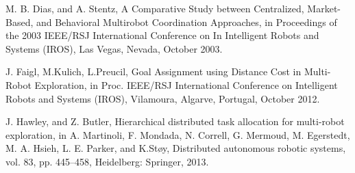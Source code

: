 \documentclass[letterpaper, 10 pt, conference]{ieeeconf}  %
\begin{document}
\begin{thebibliography}{99}
 M. B. Dias, and A. Stentz, A Comparative Study between Centralized, Market-Based, and Behavioral Multirobot Coordination Approaches, in Proceedings of the 2003 IEEE/RSJ  International Conference on In Intelligent Robots and Systems (IROS), Las Vegas, Nevada, October 2003.

 J. Faigl, M.Kulich, L.Preucil, Goal Assignment using Distance Cost in Multi-Robot Exploration, in Proc. IEEE/RSJ  International Conference on Intelligent Robots and Systems (IROS), Vilamoura, Algarve, Portugal, October 2012.

 J. Hawley, and Z. Butler, Hierarchical distributed task allocation for multi-robot exploration, in A. Martinoli, F. Mondada, N. Correll, G. Mermoud, M. Egerstedt, M. A. Hsieh, L. E. Parker, and K.Støy, Distributed autonomous robotic systems, vol. 83, pp. 445–458, Heidelberg: Springer, 2013.

\end{thebibliography}
\end{document}
